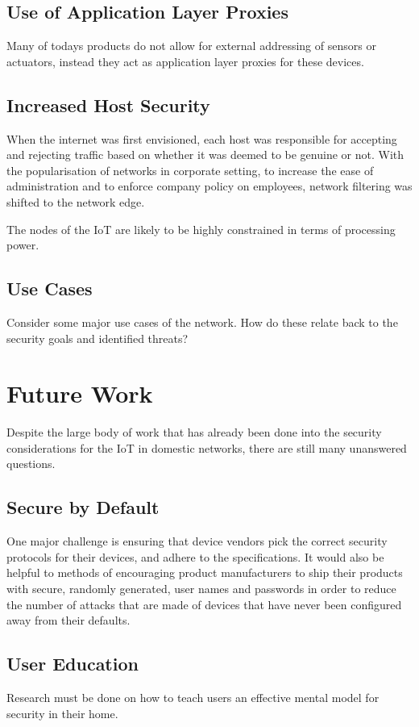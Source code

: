 \documentclass[10pt,journal,compsoc]{IEEEtran}
\begin{document}
\subsection{Use of Application Layer Proxies}
Many of todays products do not allow for external addressing of sensors or
actuators, instead they act as application layer proxies for these devices.  

\subsection{Increased Host Security}
When the internet was first envisioned, each host was responsible for accepting
and rejecting traffic based on whether it was deemed to be genuine or not. With
the popularisation of networks in corporate setting, to increase the ease of
administration and to enforce company policy on employees, network filtering
was shifted to the network edge.

The nodes of the IoT are likely to be highly constrained in terms of processing
power. 

\subsection{Use Cases}
Consider some major use cases of the network.
How do these relate back to the security goals and identified threats?


\section{Future Work}
Despite the large body of work that has already been done into the security
considerations for the IoT in domestic networks, there are still many
unanswered questions. 

\subsection{Secure by Default}
One major challenge is ensuring that device vendors pick the correct security
protocols for their devices, and adhere to the specifications. It would also be
helpful to methods of encouraging product manufacturers to ship their products
with secure, randomly generated, user names and passwords in order to reduce
the number of attacks that are made of devices that have never been configured
away from their defaults.

\subsection{User Education}
Research must be done on how to teach users an effective mental model for security in their home.
\end{document}
